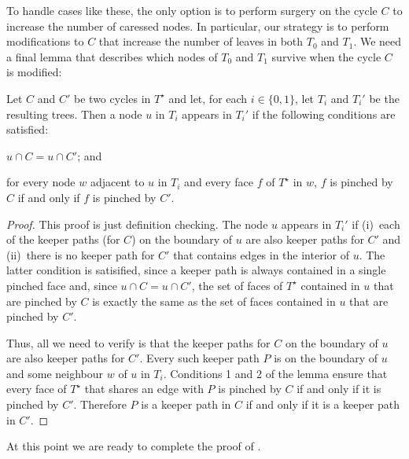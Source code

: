 \documentclass{patmorin}
\newcommand{\dual}[1]{{#1}^\star}
\begin{document}
To handle cases like these, the only option is to perform surgery on
the cycle $C$ to increase the number of caressed nodes. In particular,
our strategy is to perform modifications to $C$ that increase the number
of leaves in both $T_0$ and $T_1$.  We need a final lemma that describes
which nodes of $T_0$ and $T_1$ survive when the cycle $C$ is modified:

\begin{lem}
   Let $C$ and $C'$ be two cycles in $\dual{T}$ and let, for each $i\in\{0,1\}$, let $T_i$ and $T_i'$ be the resulting trees.  Then a node $u$ in $T_i$ appears in $T_i'$ if the following conditions are satisfied:
  \begin{compactenum}
     \item $u\cap C = u\cap C'$; and
     \item for every node $w$ adjacent to $u$ in $T_i$ and every face $f$ of $\dual{T}$ in $w$, $f$ is pinched by $C$ if and only if $f$ is pinched by $C'$.
 \end{compactenum}
\end{lem}

\begin{proof}
   This proof is just definition checking.
   The node $u$ appears in $T_i'$ if (i)~each of the keeper paths
   (for $C$) on the boundary of $u$ are also keeper paths for $C'$ and
   (ii)~there is no keeper path for $C'$ that contains edges in the
   interior of $u$.  The latter condition is satisified, since a keeper
   path is always contained in a single pinched face and, since $u\cap
   C=u\cap C'$, the set of faces of $\dual{T}$ contained in $u$ that are
   pinched by $C$ is exactly the same as the set of faces contained in
   $u$ that are pinched by $C'$.

   Thus, all we need to verify is that the keeper paths for $C$ on the
   boundary of $u$ are also keeper paths for $C'$.  Every such keeper path
   $P$ is on the boundary of $u$ and some neighbour $w$ of $u$ in $T_i$.
   Conditions 1 and 2 of the lemma ensure that every face of $\dual{T}$
   that shares an edge with $P$ is pinched by $C$ if and only if it is
   pinched by $C'$.  Therefore $P$ is a keeper path in $C$ if and only
   if it is a keeper path in $C'$.
\end{proof}


At this point we are ready to complete the proof of .
\end{document}
